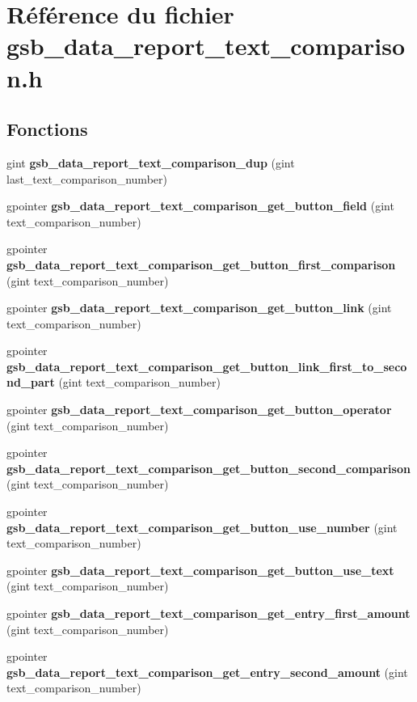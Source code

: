 \section{Référence du fichier gsb\_\-data\_\-report\_\-text\_\-comparison.h}
\label{gsb__data__report__text__comparison_8h}
\subsection*{Fonctions}
\begin{DoxyCompactItemize}
\item 
gint {\bf gsb\_\-data\_\-report\_\-text\_\-comparison\_\-dup} (gint last\_\-text\_\-comparison\_\-number)
\item 
gpointer {\bf gsb\_\-data\_\-report\_\-text\_\-comparison\_\-get\_\-button\_\-field} (gint text\_\-comparison\_\-number)
\item 
gpointer {\bf gsb\_\-data\_\-report\_\-text\_\-comparison\_\-get\_\-button\_\-first\_\-comparison} (gint text\_\-comparison\_\-number)
\item 
gpointer {\bf gsb\_\-data\_\-report\_\-text\_\-comparison\_\-get\_\-button\_\-link} (gint text\_\-comparison\_\-number)
\item 
gpointer {\bf gsb\_\-data\_\-report\_\-text\_\-comparison\_\-get\_\-button\_\-link\_\-first\_\-to\_\-second\_\-part} (gint text\_\-comparison\_\-number)
\item 
gpointer {\bf gsb\_\-data\_\-report\_\-text\_\-comparison\_\-get\_\-button\_\-operator} (gint text\_\-comparison\_\-number)
\item 
gpointer {\bf gsb\_\-data\_\-report\_\-text\_\-comparison\_\-get\_\-button\_\-second\_\-comparison} (gint text\_\-comparison\_\-number)
\item 
gpointer {\bf gsb\_\-data\_\-report\_\-text\_\-comparison\_\-get\_\-button\_\-use\_\-number} (gint text\_\-comparison\_\-number)
\item 
gpointer {\bf gsb\_\-data\_\-report\_\-text\_\-comparison\_\-get\_\-button\_\-use\_\-text} (gint text\_\-comparison\_\-number)
\item 
gpointer {\bf gsb\_\-data\_\-report\_\-text\_\-comparison\_\-get\_\-entry\_\-first\_\-amount} (gint text\_\-comparison\_\-number)
\item 
gpointer {\bf gsb\_\-data\_\-report\_\-text\_\-comparison\_\-get\_\-entry\_\-second\_\-amount} (gint text\_\-comparison\_\-number)
\item 

\end{DoxyCompactItemize}
